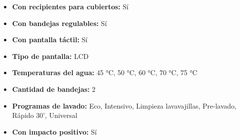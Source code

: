 \documentclass{article}
\begin{document}
\begin{adjustwidth}{2em}{}
\begin{itemize}
    \item \textbf {Con recipientes para cubiertos:} Sí
    \item \textbf {Con bandejas regulables:} Sí
    \item \textbf {Con pantalla táctil:} Sí
    \item \textbf {Tipo de pantalla:} LCD
    \item \textbf {Temperaturas del agua:} 45 °C, 50 °C, 60 °C, 70 °C, 75 °C
    \item \textbf {Cantidad de bandejas:} 2
    \item \textbf {Programas de lavado:} Eco, Intensivo, Limpieza lavavajillas, Pre-lavado, Rápido 30', Universal
    \item \textbf {Con impacto positivo:} Sí
\end{itemize}

\vspace{1\baselineskip} %
\end{adjustwidth}
\end{document}

